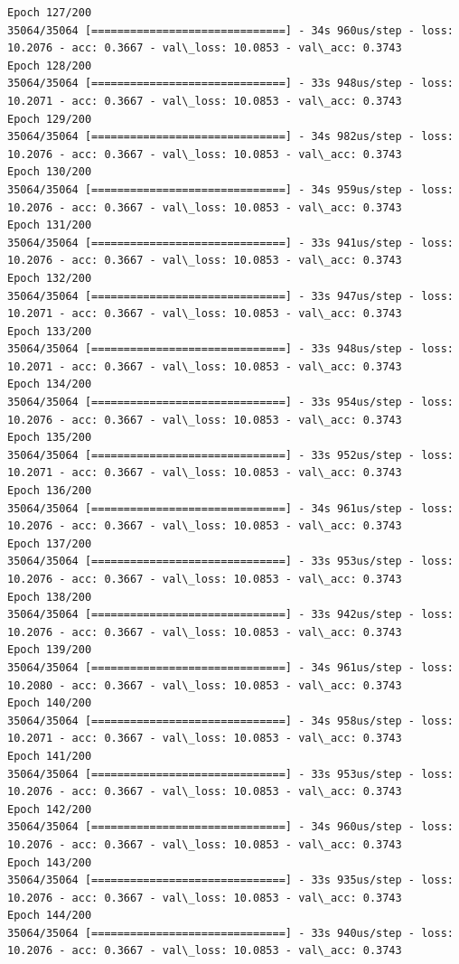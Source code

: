 \documentclass[11pt]{article}
\begin{document}
\begin{Verbatim}[commandchars=\\\{\}]
Epoch 127/200
35064/35064 [==============================] - 34s 960us/step - loss: 10.2076 - acc: 0.3667 - val\_loss: 10.0853 - val\_acc: 0.3743
Epoch 128/200
35064/35064 [==============================] - 33s 948us/step - loss: 10.2071 - acc: 0.3667 - val\_loss: 10.0853 - val\_acc: 0.3743
Epoch 129/200
35064/35064 [==============================] - 34s 982us/step - loss: 10.2076 - acc: 0.3667 - val\_loss: 10.0853 - val\_acc: 0.3743
Epoch 130/200
35064/35064 [==============================] - 34s 959us/step - loss: 10.2076 - acc: 0.3667 - val\_loss: 10.0853 - val\_acc: 0.3743
Epoch 131/200
35064/35064 [==============================] - 33s 941us/step - loss: 10.2076 - acc: 0.3667 - val\_loss: 10.0853 - val\_acc: 0.3743
Epoch 132/200
35064/35064 [==============================] - 33s 947us/step - loss: 10.2071 - acc: 0.3667 - val\_loss: 10.0853 - val\_acc: 0.3743
Epoch 133/200
35064/35064 [==============================] - 33s 948us/step - loss: 10.2071 - acc: 0.3667 - val\_loss: 10.0853 - val\_acc: 0.3743
Epoch 134/200
35064/35064 [==============================] - 33s 954us/step - loss: 10.2076 - acc: 0.3667 - val\_loss: 10.0853 - val\_acc: 0.3743
Epoch 135/200
35064/35064 [==============================] - 33s 952us/step - loss: 10.2071 - acc: 0.3667 - val\_loss: 10.0853 - val\_acc: 0.3743
Epoch 136/200
35064/35064 [==============================] - 34s 961us/step - loss: 10.2076 - acc: 0.3667 - val\_loss: 10.0853 - val\_acc: 0.3743
Epoch 137/200
35064/35064 [==============================] - 33s 953us/step - loss: 10.2076 - acc: 0.3667 - val\_loss: 10.0853 - val\_acc: 0.3743
Epoch 138/200
35064/35064 [==============================] - 33s 942us/step - loss: 10.2076 - acc: 0.3667 - val\_loss: 10.0853 - val\_acc: 0.3743
Epoch 139/200
35064/35064 [==============================] - 34s 961us/step - loss: 10.2080 - acc: 0.3667 - val\_loss: 10.0853 - val\_acc: 0.3743
Epoch 140/200
35064/35064 [==============================] - 34s 958us/step - loss: 10.2071 - acc: 0.3667 - val\_loss: 10.0853 - val\_acc: 0.3743
Epoch 141/200
35064/35064 [==============================] - 33s 953us/step - loss: 10.2076 - acc: 0.3667 - val\_loss: 10.0853 - val\_acc: 0.3743
Epoch 142/200
35064/35064 [==============================] - 34s 960us/step - loss: 10.2076 - acc: 0.3667 - val\_loss: 10.0853 - val\_acc: 0.3743
Epoch 143/200
35064/35064 [==============================] - 33s 935us/step - loss: 10.2076 - acc: 0.3667 - val\_loss: 10.0853 - val\_acc: 0.3743
Epoch 144/200
35064/35064 [==============================] - 33s 940us/step - loss: 10.2076 - acc: 0.3667 - val\_loss: 10.0853 - val\_acc: 0.3743

\end{Verbatim}
\end{document}
